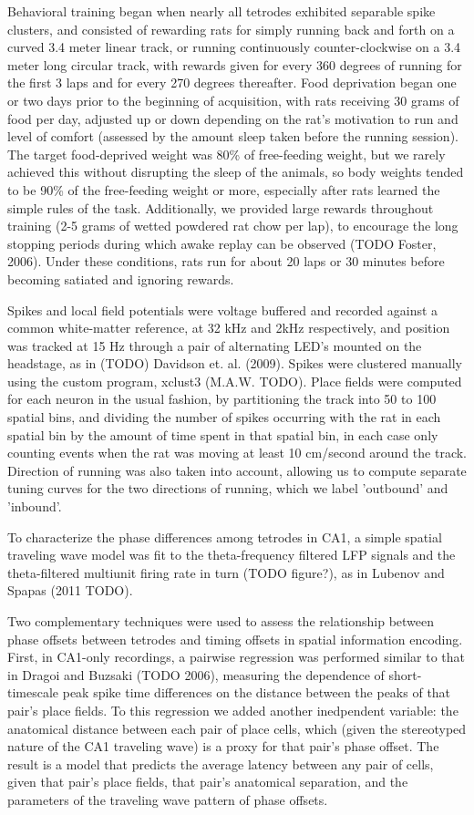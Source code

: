 \documentclass[10pt]{article}
\begin{document}
Behavioral training began when nearly all tetrodes exhibited separable spike clusters, and consisted of rewarding rats for simply running back and forth on a curved 3.4 meter linear track, or running continuously counter-clockwise on a 3.4 meter long circular track, with rewards given for every 360 degrees of running for the first 3 laps and for every 270 degrees thereafter. Food deprivation began one or two days prior to the beginning of acquisition, with rats receiving 30 grams of food per day, adjusted up or down depending on the rat's motivation to run and level of comfort (assessed by the amount sleep taken before the running session). The target food-deprived weight was 80\% of free-feeding weight, but we rarely achieved this without disrupting the sleep of the animals, so body weights tended to be 90\% of the free-feeding weight or more, especially after rats learned the simple rules of the task. Additionally, we provided large rewards throughout training (2-5 grams of wetted powdered rat chow per lap), to encourage the long stopping periods during which awake replay can be observed (TODO Foster, 2006). Under these conditions, rats run for about 20 laps or 30 minutes before becoming satiated and ignoring rewards.

Spikes and local field potentials were voltage buffered and recorded against a common white-matter reference, at 32 kHz and 2kHz respectively, and position was tracked at 15 Hz through a pair of alternating LED's mounted on the headstage, as in (TODO) Davidson et. al. (2009). Spikes were clustered manually using the custom program, xclust3 (M.A.W. TODO). Place fields were computed for each neuron in the usual fashion, by partitioning the track into 50 to 100 spatial bins, and dividing the number of spikes occurring with the rat in each spatial bin by the amount of time spent in that spatial bin, in each case only counting events when the rat was moving at least 10 cm/second around the track. Direction of running was also taken into account, allowing us to compute separate tuning curves for the two directions of running, which we label 'outbound' and 'inbound'.

To characterize the phase differences among tetrodes in CA1, a simple spatial traveling wave model was fit to the theta-frequency filtered LFP signals and the theta-filtered multiunit firing rate in turn (TODO figure?), as in Lubenov and Spapas (2011 TODO).

Two complementary techniques were used to assess the relationship between phase offsets between tetrodes and timing offsets in spatial information encoding. First, in CA1-only recordings, a pairwise regression was performed similar to that in Dragoi and Buzsaki (TODO 2006), measuring the dependence of short-timescale peak spike time differences on the distance between the peaks of that pair's place fields. To this regression we added another inedpendent variable: the anatomical distance between each pair of place cells, which (given the stereotyped nature of the CA1 traveling wave) is a proxy for that pair's phase offset. The result is a model that predicts the average latency between any pair of cells, given that pair's place fields, that pair's anatomical separation, and the parameters of the traveling wave pattern of phase offsets.
\end{document}
